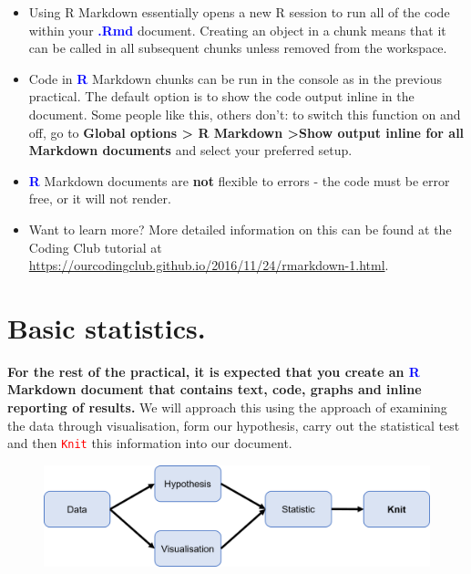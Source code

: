 \documentclass[a4paper,12pt]{article}
\newcommand\boldblue[1]{\textcolor{blue}{\textbf{#1}}}
\newcommand\code[1]{\textcolor{red}{\texttt{#1}}}
\begin{document}
\begin{itemize}

\item Using R Markdown essentially opens a new R session to run all of the code within your \boldblue{.Rmd} document. Creating an object in a chunk means that it can be called in all subsequent chunks unless removed from the workspace.

\item Code in \boldblue{R} Markdown chunks can be run in the console as in the previous practical. The default option is to show the code output inline in the document. Some people like this, others don't: to switch this function on and off, go to \textbf{Global options > R Markdown >Show output inline for all Markdown documents} and select your preferred setup.

\item \boldblue{R} Markdown documents are \textbf{not} flexible to errors - the code must be error free, or it will not render.

\item Want to learn more? More detailed information on this can be found at the Coding Club tutorial at \url{https://ourcodingclub.github.io/2016/11/24/rmarkdown-1.html}. \\

\end{itemize}




\section{Basic statistics.}

\textbf{For the rest of the practical, it is expected that you create an \boldblue{R} Markdown document that contains text, code, graphs and inline reporting of results.} We will approach this using the  approach of examining the data through visualisation, form our hypothesis, carry out the statistical test and then \code{Knit} this information into our document. \\


\begin{figure}[h]
\centering 
\includegraphics[width=.8\textwidth]{figs/StatisticsFlow2.png}
\label{fig:StatisticsFlow}
\end{figure} 
\end{document}
